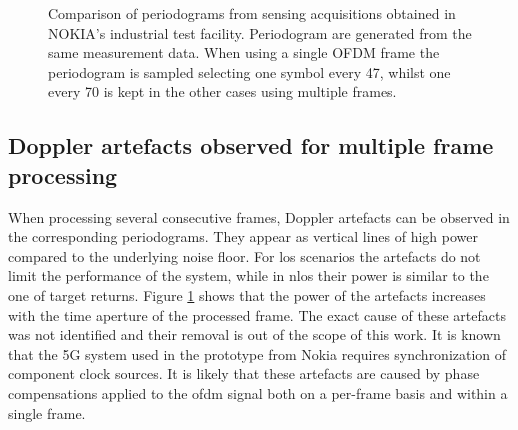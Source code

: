 \begin{figure}[b!]
{			}\hfill
			\caption[]{\small Comparison of periodograms from sensing acquisitions obtained in NOKIA's industrial test facility.
				Periodogram are generated from the same measurement data. When using a single OFDM frame the periodogram is sampled selecting one symbol every 47, whilst one every 70 is kept in the other cases using multiple frames.  }
			\label{fig:TDD_artefacts}
		\end{figure}
		
	\subsection{Doppler artefacts observed for multiple frame processing}

		When processing several consecutive frames, Doppler artefacts can be observed in the corresponding periodograms.
		They appear as vertical lines of high power compared to the underlying noise floor.
		For \gls{los} scenarios the artefacts do not limit the performance of the system, while in \gls{nlos} their power is similar to the one of target returns.
		Figure \ref{fig:TDD_artefacts} shows that the power of the artefacts increases with the time aperture of the processed frame.
		The exact cause of these artefacts was not identified and their removal is out of the scope of this work. It is known that the 5G system used in the prototype from Nokia requires synchronization of component clock sources.
		It is likely that these artefacts are caused by phase compensations applied to the \gls{ofdm} signal both on a per-frame basis and within a single frame.
		
		
		